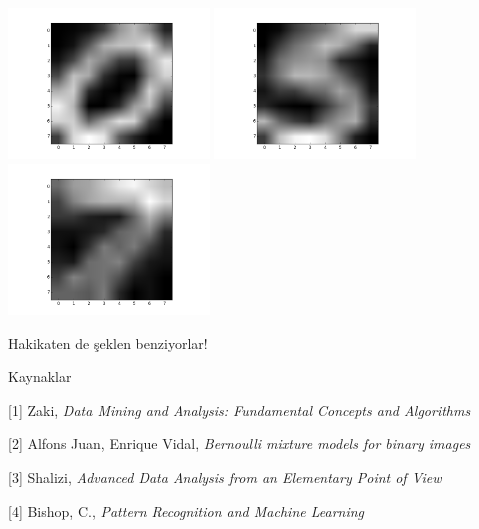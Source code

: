 \documentclass[12pt,fleqn]{article}\usepackage{../../common}
\begin{document}
\includegraphics[height=4cm]{mixbern_01.png}
\includegraphics[height=4cm]{mixbern_02.png}
\includegraphics[height=4cm]{mixbern_03.png}

Hakikaten de şeklen benziyorlar!

Kaynaklar

[1] Zaki, {\em Data Mining and Analysis: Fundamental Concepts and Algorithms}

[2] Alfons Juan, Enrique Vidal, {\em Bernoulli mixture models for binary images}

[3] Shalizi, {\em Advanced Data Analysis from an Elementary Point of View}

[4] Bishop, C., {\em Pattern Recognition and Machine Learning}
\end{document}
